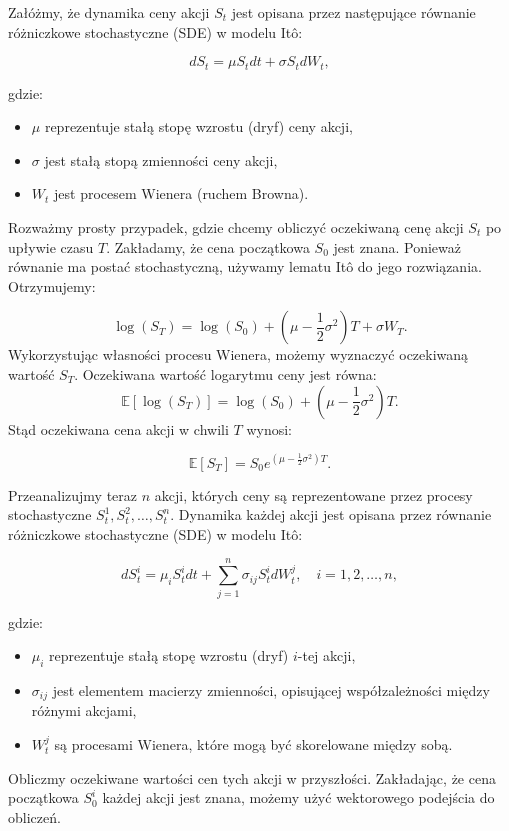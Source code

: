 Załóżmy, że dynamika ceny akcji \( S_t \) jest opisana przez następujące równanie różniczkowe stochastyczne (SDE) w modelu Itô:

\begin{equation}
dS_t = \mu S_t dt + \sigma S_t dW_t,
\end{equation}

gdzie:
\begin{itemize}
  \item \( \mu \) reprezentuje stałą stopę wzrostu (dryf) ceny akcji,
  \item \( \sigma \) jest stałą stopą zmienności ceny akcji,
  \item \( W_t \) jest procesem Wienera (ruchem Browna).
\end{itemize}
Rozważmy prosty przypadek, gdzie chcemy obliczyć oczekiwaną cenę akcji \( S_t \) po upływie czasu \( T \). Zakładamy, że cena początkowa \( S_0 \) jest znana. Ponieważ równanie ma postać stochastyczną, używamy lematu Itô do jego rozwiązania. Otrzymujemy:

\begin{equation}
\log(S_T) = \log(S_0) + \left( \mu - \frac{1}{2} \sigma^2 \right) T + \sigma W_T.
\end{equation}
Wykorzystując własności procesu Wienera, możemy wyznaczyć oczekiwaną wartość \( S_T \). Oczekiwana wartość logarytmu ceny jest równa:
\begin{equation}
\mathbb{E}[\log(S_T)] = \log(S_0) + \left( \mu - \frac{1}{2} \sigma^2 \right) T.
\end{equation}
Stąd oczekiwana cena akcji w chwili \( T \) wynosi:

\begin{equation}
\mathbb{E}[S_T] = S_0 e^{\left( \mu - \frac{1}{2} \sigma^2 \right) T}.
\end{equation}

Przeanalizujmy teraz \( n \) akcji, których ceny są reprezentowane przez procesy stochastyczne \( S_t^1, S_t^2, \ldots, S_t^n \). Dynamika każdej akcji jest opisana przez równanie różniczkowe stochastyczne (SDE) w modelu Itô:

\begin{equation}
dS_t^i = \mu_i S_t^i dt + \sum_{j=1}^n \sigma_{ij} S_t^i dW_t^j, \quad i = 1, 2, \ldots, n,
\end{equation}

gdzie:
\begin{itemize}
  \item \( \mu_i \) reprezentuje stałą stopę wzrostu (dryf) \( i \)-tej akcji,
  \item \( \sigma_{ij} \) jest elementem macierzy zmienności, opisującej współzależności między różnymi akcjami,
  \item \( W_t^j \) są procesami Wienera, które mogą być skorelowane między sobą.
\end{itemize}
Obliczmy oczekiwane wartości cen tych akcji w przyszłości. Zakładając, że cena początkowa \( S_0^i \) każdej akcji jest znana, możemy użyć wektorowego podejścia do obliczeń.

